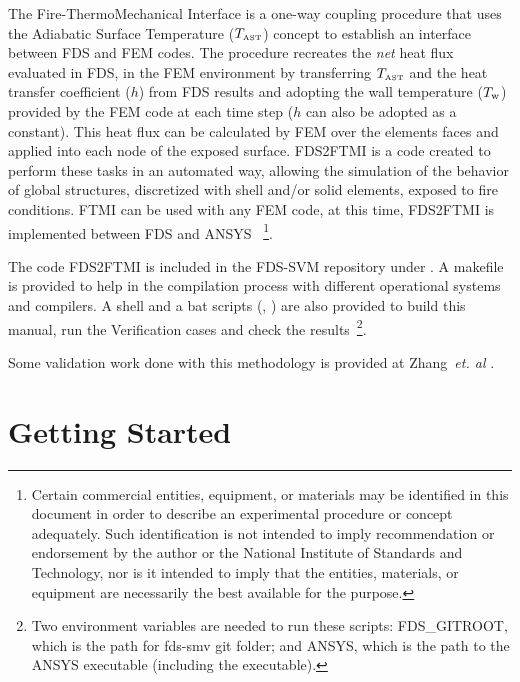 \documentclass[11pt]{book}
\begin{document}
The Fire-ThermoMechanical Interface \cite{FTMI:Methodology} is a one-way coupling procedure that uses the Adiabatic Surface Temperature ($T_{\hbox{\tiny AST}}$) concept \cite{Wickstrom:Interflam2007,Wickstrom_AST} to establish an interface between FDS and FEM codes. The procedure recreates the {\em net} heat flux evaluated in FDS, in the FEM environment by transferring $T_{\hbox{\tiny AST}}$ and the heat transfer coefficient ($h$) from FDS results and adopting the wall temperature ($T_{\rm w}$) provided by the FEM code at each time step  ($h$ can also be adopted as a constant). This heat flux can be calculated by FEM over the elements faces and applied into each node of the exposed surface. FDS2FTMI is a code created to perform these tasks in an automated way, allowing the simulation of the behavior of global structures, discretized with shell and/or solid elements, exposed to fire conditions. FTMI can be used with any FEM code, at this time, FDS2FTMI is implemented between FDS and A{\footnotesize NSYS} ~\footnote{Certain commercial entities, equipment, or materials may be identified in this document in order to describe an experimental procedure or concept adequately. Such identification is not intended to imply recommendation or endorsement by the author or the National Institute of Standards and Technology, nor is it intended to imply that the entities, materials, or equipment are necessarily the best available for the purpose.}.

The code FDS2FTMI is included in the FDS-SVM repository \cite{FDS-SMV_repository} under . A makefile is provided to help in the compilation process with different operational systems and compilers. A shell and a bat scripts (, ) are also provided to build this manual, run the Verification cases and check the results~\footnote{Two environment variables are needed to run these scripts: FDS\_GITROOT, which is the path for fds-smv git folder; and ANSYS, which is the path to the ANSYS executable (including the executable).}.  

Some validation work done with this methodology is provided at Zhang~{\textit {et. al}} \cite{FTMI:Validation}.

\chapter{Getting Started}
\label{info:start}
\end{document}
